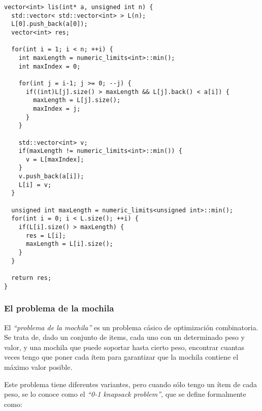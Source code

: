 \begin{center}
\begin{minipage}{1.15\textwidth}
\begin{lstlisting}[frame=lrtb]
vector<int> lis(int* a, unsigned int n) {
  std::vector< std::vector<int> > L(n);
  L[0].push_back(a[0]);
  vector<int> res;

  for(int i = 1; i < n; ++i) {
    int maxLength = numeric_limits<int>::min();
    int maxIndex = 0;

    for(int j = i-1; j >= 0; --j) {
      if((int)L[j].size() > maxLength && L[j].back() < a[i]) {
        maxLength = L[j].size();
        maxIndex = j;
      }
    }
    
    std::vector<int> v;
    if(maxLength != numeric_limits<int>::min()) {
      v = L[maxIndex];      
    }
    v.push_back(a[i]);
    L[i] = v;
  }

  unsigned int maxLength = numeric_limits<unsigned int>::min();
  for(int i = 0; i < L.size(); ++i) {
    if(L[i].size() > maxLength) {
      res = L[i];
      maxLength = L[i].size();
    }
  }

  return res;
}
\end{lstlisting}
\end{minipage}
\end{center}


\newpage
\subsubsection{El problema de la mochila}

El \emph{``problema de la mochila''} es un problema c\'asico de optimizaci\'on combinatoria. Se trata de, dado un conjunto de items, cada uno con un determinado peso y valor, y una mochila que puede soportar hasta cierto peso, encontrar cuantas veces tengo que poner cada \'item para garantizar que la mochila contiene el m\'aximo valor posible.

Este problema tiene diferentes variantes, pero cuando s\'olo tengo un \'item de cada peso, se lo conoce como el \emph{``0-1 knapsack problem''}, que se define formalmente como:

\noindent{}

